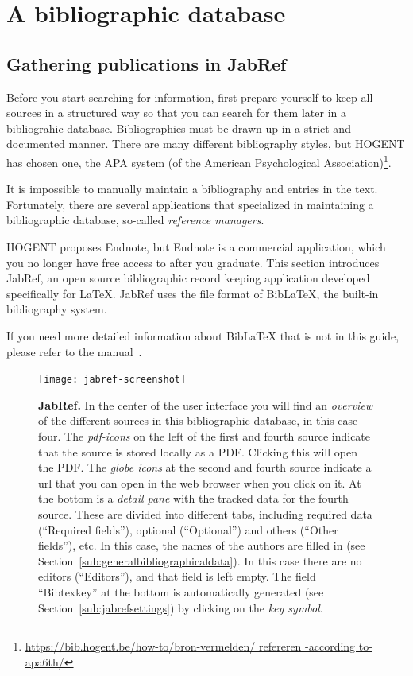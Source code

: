 \chapter{A bibliographic database}
\label{ch:bibliography}

\section{Gathering publications in JabRef}
\label{sec:publicationsjabref}

Before you start searching for information, first prepare yourself to keep all sources in a structured way so that you can search for them later in a bibliograhic database. Bibliographies must be drawn up in a strict and documented manner. There are many different bibliography styles, but HOGENT has chosen one, the APA system (of the American Psychological Association)\footnote{\url{https://bib.hogent.be/how-to/bron-vermelden/ refereren -according to-apa6th/}}.

It is impossible to manually maintain a bibliography and entries in the text. Fortunately, there are several applications that specialized in maintaining a bibliographic database, so-called \emph{reference managers}.

HOGENT proposes Endnote, but Endnote is a commercial application, which you no longer have free access to after you graduate. This section introduces JabRef, an open source bibliographic record keeping application developed specifically for {\LaTeX}. JabRef uses the file format of Bib{\LaTeX}, the built-in bibliography system.

If you need more detailed information about Bib{\LaTeX} that is not in this guide, please refer to the manual~\autocite{LehmanEtAl2016}.

\begin{figure}
  \centering
  \texttt{[image: jabref-screenshot]}
  \caption[JabRef]{\textbf{JabRef.} In the center of the user interface you will find an \emph{overview} of the different sources in this bibliographic database, in this case four. The \emph{pdf-icons} on the left of the first and fourth source indicate that the source is stored locally as a PDF. Clicking this will open the PDF. The \emph{globe icons} at the second and fourth source indicate a url that you can open in the web browser when you click on it. At the bottom is a \emph{detail pane} with the tracked data for the fourth source. These are divided into different tabs, including required data (``Required fields''), optional (``Optional'') and others (``Other fields''), etc. In this case, the names of the authors are filled in (see Section~\ref{sub:generalbibliographicaldata}). In this case there are no editors (``Editors''), and that field is left empty. The field ``Bibtexkey'' at the bottom is automatically generated (see Section~\ref{sub:jabrefsettings}) by clicking on the \emph{key symbol}.} 
  \label{fig:jabref}
\end{figure}

